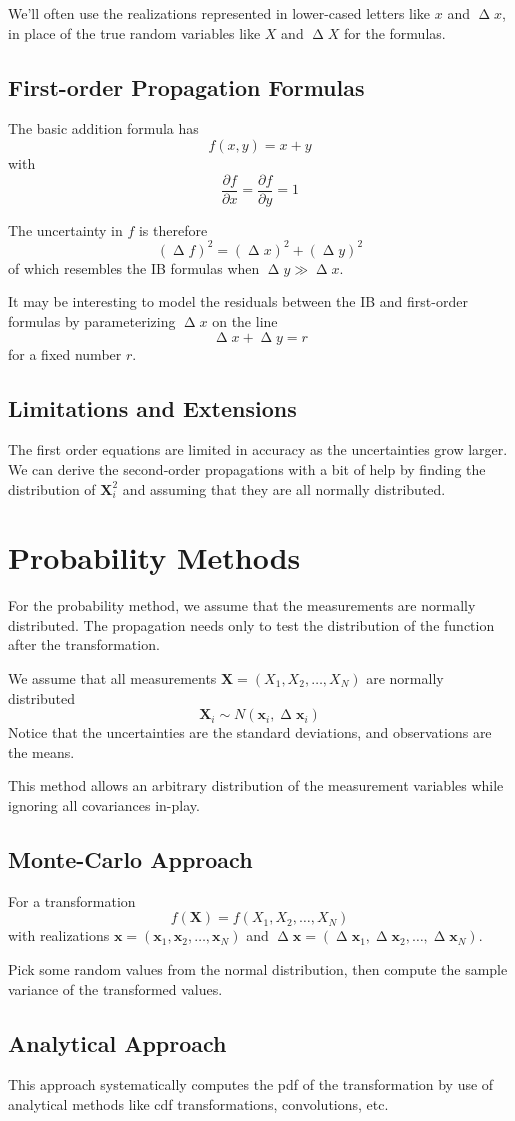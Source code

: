 \documentclass[a4paper,11pt]{article}
\DeclareMathOperator{\uncertabs}{\Delta}
\newcommand{\pde}[2]{\frac{\partial {#1}}{\partial {#2}} }
\newcommand{\lst}[1]{({#1}_1, {#1}_2, \dots, {#1}_N)}
\begin{document}
We'll often use the realizations represented in lower-cased letters like $x$ and $\uncertabs x$, in place of the true random variables like $X$ and $\uncertabs X$ for the formulas.

\subsection{First-order Propagation Formulas}
The basic addition formula has
\[
    f(x, y) = x + y
\]
with
\[
    \pde{f}{x} = \pde{f}{y} = 1
\]

The uncertainty in $f$ is therefore
\[
    (\uncertabs f)^2 = (\uncertabs x)^2 + (\uncertabs y)^2
\]
of which resembles the IB formulas when $\uncertabs y \gg \uncertabs x$.

It may be interesting to model the residuals between the IB and first-order formulas by parameterizing $\uncertabs x$ on the line
\[
    \uncertabs x + \uncertabs y = r
\]
for a fixed number $r$.

\subsection{Limitations and Extensions}
The first order equations are limited in accuracy as the uncertainties grow larger. We can derive the second-order propagations with a bit of help by finding the distribution of $\bm{X}_i^2$ and assuming that they are all normally distributed.

\newpage
\section{Probability Methods}

For the probability method, we assume that the measurements are normally distributed. The propagation needs only to test the distribution of the function after the transformation.

We assume that all measurements $\bm{X}= (X_1, X_2, \dots, X_N)$ are normally distributed
\[
    \bm{X}_i \sim N(\bm{x}_i, \uncertabs \bm{x}_i )
\]
Notice that the uncertainties are the standard deviations, and observations are the means.

This method allows an arbitrary distribution of the measurement variables while ignoring all covariances in-play.

\subsection{Monte-Carlo Approach}
For a transformation
\[
    f(\bm{X}) = f \lst{X}
\]
with realizations $\bm{x} = \lst{\bm{x}}$ and $\uncertabs \bm{x} = \lst{\uncertabs \bm{x}}$.

Pick some random values from the normal distribution, then compute the sample variance of the transformed values.

\subsection{Analytical Approach}
This approach systematically computes the pdf of the transformation by use of analytical methods like cdf transformations, convolutions, etc.
\end{document}
